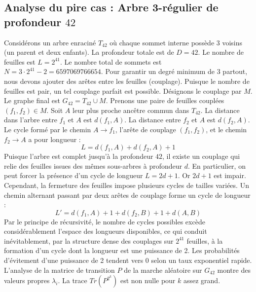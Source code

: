 \documentclass[11pt,a4paper]{article}
\begin{document}
\subsection{Analyse du pire cas : Arbre 3-régulier de profondeur $42$}
Considérons un arbre enraciné $T_{42}$ où chaque sommet interne possède 3 voisins (un parent et deux enfants).
La profondeur totale est de $D = 42$.
Le nombre de feuilles est $L = 2^{41}$.
Le nombre total de sommets est $N = 3 \cdot 2^{41} - 2 = 6597069766654$.
Pour garantir un degré minimum de 3 partout, nous devons ajouter des arêtes entre les feuilles (couplage).
Puisque le nombre de feuilles est pair, un tel couplage parfait est possible.
Désignons le couplage par $M$. Le graphe final est $G_{42} = T_{42} \cup M$.
Prenons une paire de feuilles couplées $(f_1, f_2) \in M$.
Soit $A$ leur plus proche ancêtre commun dans $T_{42}$.
La distance dans l'arbre entre $f_1$ et $A$ est $d(f_1, A)$.
La distance entre $f_2$ et $A$ est $d(f_2, A)$.
Le cycle formé par le chemin $A \to f_1$, l'arête de couplage $(f_1, f_2)$, et le chemin $f_2 \to A$ a pour longueur :
$$ L = d(f_1, A) + d(f_2, A) + 1 $$
Puisque l'arbre est complet jusqu'à la profondeur $42$, il existe un couplage qui relie des feuilles issues des mêmes sous-arbres à profondeur $d$.
En particulier, on peut forcer la présence d'un cycle de longueur $L = 2d + 1$. Or $2d+1$ est impair.
Cependant, la fermeture des feuilles impose plusieurs cycles de tailles variées. Un chemin alternant passant par deux arêtes de couplage forme un cycle de longueur :
$$ L' = d(f_1, A) + 1 + d(f_2, B) + 1 + d(A, B) $$
Par le principe de récursivité, le nombre de cycles possibles excède considérablement l'espace des longueurs disponibles, ce qui conduit inévitablement, par la structure dense des couplages sur $2^{41}$ feuilles, à la formation d'un cycle dont la longueur est une puissance de 2. Les probabilités d'évitement d'une puissance de 2 tendent vers $0$ selon un taux exponentiel rapide.
L'analyse de la matrice de transition $P$ de la marche aléatoire sur $G_{42}$ montre des valeurs propres $\lambda_i$. La trace $Tr(P^{2^k})$ est non nulle pour $k$ assez grand.
\end{document}
